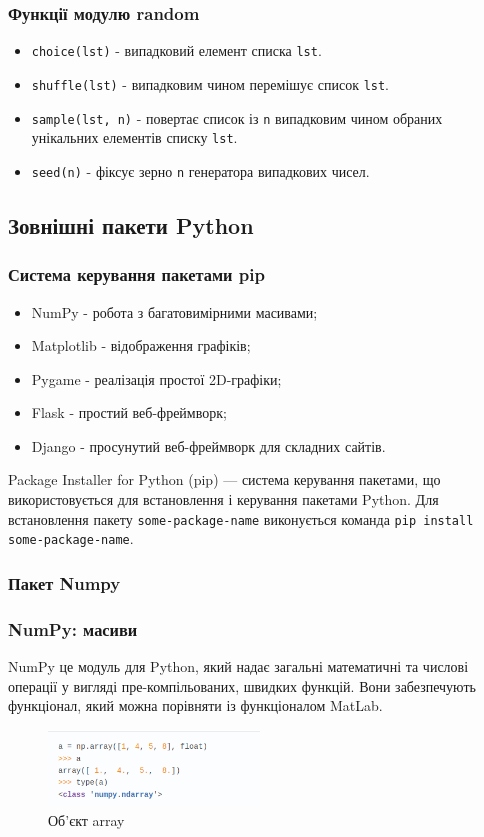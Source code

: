 \begin{frame}
\frametitle{Функції модулю random}
\begin{itemize}
  \item \texttt{choice(lst)} - випадковий елемент списка \texttt{lst}.
  \item \texttt{shuffle(lst)} - випадковим чином перемішує список \texttt{lst}.
  \item \texttt{sample(lst, n)} - повертає список із \texttt{n} випадковим чином обраних унікальних елементів списку \texttt{lst}.
  \item \texttt{seed(n)} - фіксує зерно \texttt{n} генератора випадкових чисел.
\end{itemize}

\end{frame}

\subsection{Зовнішні пакети Python} 
\begin{frame}
\frametitle{Система керування пакетами pip}
\begin{itemize}
  \item NumPy - робота з багатовимірними масивами;
  \item Matplotlib - відображення графіків;
  \item Pygame - реалізація простої 2D-графіки;
  \item Flask - простий веб-фреймворк;
  \item Django - просунутий веб-фреймворк для складних сайтів.
\end{itemize}

Package Installer for Python (pip) — система керування пакетами, що використовується для встановлення і керування пакетами Python. Для встановлення пакету \texttt{some-package-name} виконується команда \texttt{pip install some-package-name}.
\end{frame}

\subsubsection{Пакет Numpy}
\begin{frame}
\frametitle{NumPy: масиви}
NumPy це модуль для Python, який надає загальні математичні та числові операції у вигляді пре-компільованих, швидких функцій. Вони забезпечують функціонал, який можна порівняти із функціоналом MatLab.
\begin{figure}
  \begin{center}
    \includegraphics[width=0.5\textwidth,height=0.35\textheight]{pictures/array.png}
  \caption{Об'єкт array}
\label{function}
  \end{center}
\end{figure}
\end{frame}

